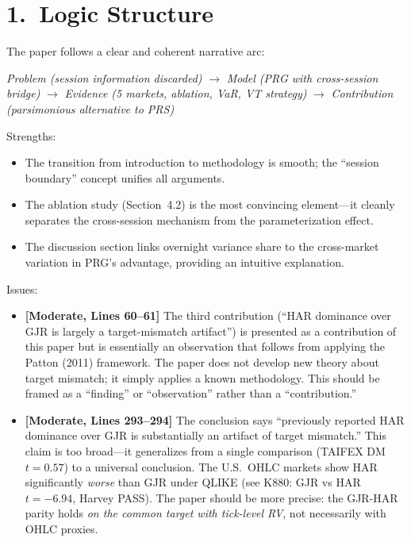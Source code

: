 \documentclass[12pt,a4paper]{article}
\begin{document}
\bigskip

\section*{1.\ Logic Structure}

The paper follows a clear and coherent narrative arc:

\begin{center}
\textit{Problem (session information discarded)} $\to$ \textit{Model (PRG with cross-session bridge)} $\to$ \textit{Evidence (5 markets, ablation, VaR, VT strategy)} $\to$ \textit{Contribution (parsimonious alternative to PRS)}
\end{center}

\noindent \textcolor{okgreen}{Strengths:}
\begin{itemize}[nosep]
\item The transition from introduction to methodology is smooth; the ``session boundary'' concept unifies all arguments.
\item The ablation study (Section~4.2) is the most convincing element---it cleanly separates the cross-session mechanism from the parameterization effect.
\item The discussion section links overnight variance share to the cross-market variation in PRG's advantage, providing an intuitive explanation.
\end{itemize}

\noindent \textcolor{warncolor}{Issues:}
\begin{itemize}[nosep]
\item [\textcolor{warncolor}{M1}] \textbf{[Moderate, Lines 60--61]} The third contribution (``HAR dominance over GJR is largely a target-mismatch artifact'') is presented as a contribution of this paper but is essentially an observation that follows from applying the Patton (2011) framework. The paper does not develop new theory about target mismatch; it simply applies a known methodology. This should be framed as a ``finding'' or ``observation'' rather than a ``contribution.''
\item [\textcolor{warncolor}{M2}] \textbf{[Moderate, Lines 293--294]} The conclusion says ``previously reported HAR dominance over GJR is substantially an artifact of target mismatch.'' This claim is too broad---it generalizes from a single comparison (TAIFEX DM $t=0.57$) to a universal conclusion. The U.S.\ OHLC markets show HAR significantly \emph{worse} than GJR under QLIKE (see K880: GJR vs HAR $t=-6.94$, Harvey PASS). The paper should be more precise: the GJR-HAR parity holds \emph{on the common target with tick-level RV}, not necessarily with OHLC proxies.
\end{itemize}
\end{document}
